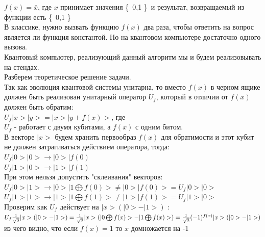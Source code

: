 \documentclass[11pt]{report}
\begin{document}
$f(x) = \bar{x} $, где $x$ принимает значения \{\ 0,1 \}\ и результат, возвращаемый из функции есть \{\ 0,1 \}\ \\

В классике, нужно вызвать функцию $f(x)$ два раза, чтобы ответить на вопрос является ли функция константой. Но на квантовом компьютере достаточно одного вызова. \\

Квантовый компьютер, реализующий данный алгоритм мы и будем реализовывать на стендах. \\

Разберем теоретическое решение задачи. \\

Так как эволюция квантовой системы унитарна, то вместо $f(x)$ в черном ящике должен быть реализован унитарный оператор $U_f$, который в отличии от $f(x)$ должен быть обратим:\\

$U_f|x>|y> = |x>|y+f(x)>$, где \\

$U_f$ - работает с двумя кубитами, а $f(x)$ с одним битом.\\

В векторе $|x>$ будем хранить первообраз $f(x)$ для обратимости и этот кубит не должен затрагиваться действием оператора, тогда: \\

$U_f|0>|0> \rightarrow |0>|f(0)$ \\

$U_f|1>|0> \rightarrow |1>|f(1)$  \\

При этом нельзя допустить "склеивания" векторов: \\

$U_f|0>|1> \rightarrow |0>|1 \bigoplus f(0)> \neq |0>|f(0)> = U_f|0>|0> $ \\

$U_f|1>|1> \rightarrow |1>|1 \bigoplus f(1)> \neq |1>|f(1)> = U_f|1>|0> $ \\

Проверим как $U_f$ действует на $|x>(|0>-|1>)$ : \\

$U_f\frac{1}{\sqrt2}|x>(|0>-|1>)=\frac{1}{\sqrt2}|x>(|0 \bigoplus f(x)> - |1 \bigoplus f(x)>) \\ = 
\frac{1}{\sqrt2}(-1)^{f(x)}|x>(|0>-|1>)$ \\

из чего видно, что если $f(x)=1$ то $x$ домножается на -1 \\
\end{document}
